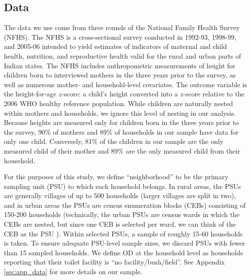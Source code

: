 \documentclass[12pt,a4paper,titlepage]{article}
\begin{document}
\subsection{Data}
The data we use come from three rounds of the National Family Health Survey (NFHS). The NFHS is a cross-sectional survey conducted in 1992-93, 1998-99, and 2005-06 intended to yield estimates of indicators of maternal and child health, nutrition, and reproductive health valid for the rural and urban parts of Indian states. The NFHS includes anthropometric measurements of height for children born to interviewed mothers in the three years prior to the survey, as well as numerous mother- and household-level covariates. The outcome variable is the height-for-age $z$-score: a child's height converted into a $z$-score relative to the 2006 WHO healthy reference population. While children are naturally nested within mothers and households, we ignore this level of nesting in our analysis. Because heights are measured only for children born in the three years prior to the survey, 90\% of mothers and 89\% of households in our sample have data for only one child. Conversely, 81\% of the children in our sample are the only measured child of their mother and 89\% are the only measured child from their household.

For the purposes of this study, we define ``neighborhood'' to be the primary sampling unit (PSU) to which each household belongs. In rural areas, the PSUs are generally villages of up to 500 households (larger villages are split in two), and in urban areas the PSUs are census enumeration blocks (CEBs) consisting of 150-200 households (technically, the urban PSUs are census wards in which the CEBs are nested, but since one CEB is selected per ward, we can think of the CEB as the PSU \citep{roy_acharya}). Within selected PSUs, a sample of roughly 15-60 households is taken. To ensure adequate PSU-level sample sizes, we discard PSUs with fewer than 15 sampled households. We define OD at the household level as households reporting that their toilet facility is ``no facility/bush/field''. See Appendix \ref{sec:app_data} for more details on our sample.

\end{document}
